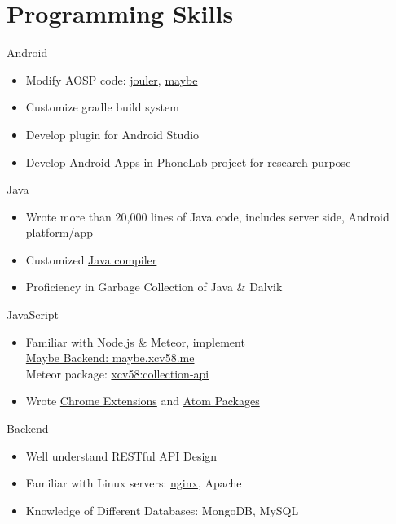 \section{Programming Skills}
\cvcomputer
{Android}{
\begin{itemize}
  \item Modify AOSP code:
  \href{http://platform.phone-lab.org:8080/gitweb?p=platform/frameworks/base.git;a=search;h=refs/heads/experiment/1/jouler;s=Yihong+Chen;st=author}{jouler},
  \href{http://platform.phone-lab.org:8080/gitweb?p=platform/frameworks/base.git;a=search;h=refs/heads/experiment/3/maybe;s=Yihong+Chen;st=author}{maybe}
  \item Customize gradle build system
  \item Develop plugin for Android Studio
  \item Develop Android Apps in
  \href{https://phone-lab.org/}{PhoneLab} project for research purpose
\end{itemize}
}
{Java}{
\begin{itemize}
  \item Wrote more than 20,000 lines of Java code, includes server side, Android platform/app
  \item Customized \href{https://github.com/blue-systems-group/project.maybe.polyglot}{Java compiler}
  \item Proficiency in Garbage Collection of Java \& Dalvik
\end{itemize}
}

\cvcomputer
{JavaScript}{
\begin{itemize}
  \item Familiar with Node.js \& Meteor, implement
  \\\href{http://maybe.cse.buffalo.edu}{Maybe Backend: maybe.xcv58.me}
  \\Meteor package:
  \href{https://atmospherejs.com/xcv58/collection-api}{xcv58:collection-api}
  \item Wrote \href{https://chrome.google.com/webstore/search/xcv58?hl=en}{Chrome Extensions} and
  \href{https://atom.io/users/xcv58}{Atom Packages}
\end{itemize}
}
{Backend}{
\begin{itemize}
  \item Well understand RESTful API Design
  \item Familiar with Linux servers:
  \href{https://github.com/xcv58/nginx-config}{nginx}, Apache
  \item Knowledge of Different Databases: MongoDB, MySQL
\end{itemize}
}

